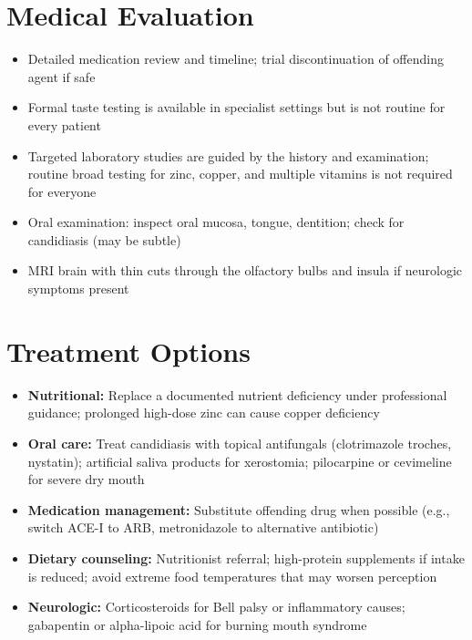 \section*{Medical Evaluation}
\begin{itemize}
  \item Detailed medication review and timeline; trial discontinuation of offending agent if safe
  \item Formal taste testing is available in specialist settings but is not routine for every patient
  \item Targeted laboratory studies are guided by the history and examination; routine broad testing for zinc, copper, and multiple vitamins is not required for everyone
  \item Oral examination: inspect oral mucosa, tongue, dentition; check for candidiasis (may be subtle)
  \item MRI brain with thin cuts through the olfactory bulbs and insula if neurologic symptoms present
\end{itemize}

\section*{Treatment Options}
\begin{itemize}
  \item \textbf{Nutritional:} Replace a documented nutrient deficiency under professional guidance; prolonged high-dose zinc can cause copper deficiency
  \item \textbf{Oral care:} Treat candidiasis with topical antifungals (clotrimazole troches, nystatin); artificial saliva products for xerostomia; pilocarpine or cevimeline for severe dry mouth
  \item \textbf{Medication management:} Substitute offending drug when possible (e.g., switch ACE-I to ARB, metronidazole to alternative antibiotic)
  \item \textbf{Dietary counseling:} Nutritionist referral; high-protein supplements if intake is reduced; avoid extreme food temperatures that may worsen perception
  \item \textbf{Neurologic:} Corticosteroids for Bell palsy or inflammatory causes; gabapentin or alpha-lipoic acid for burning mouth syndrome
\end{itemize}

